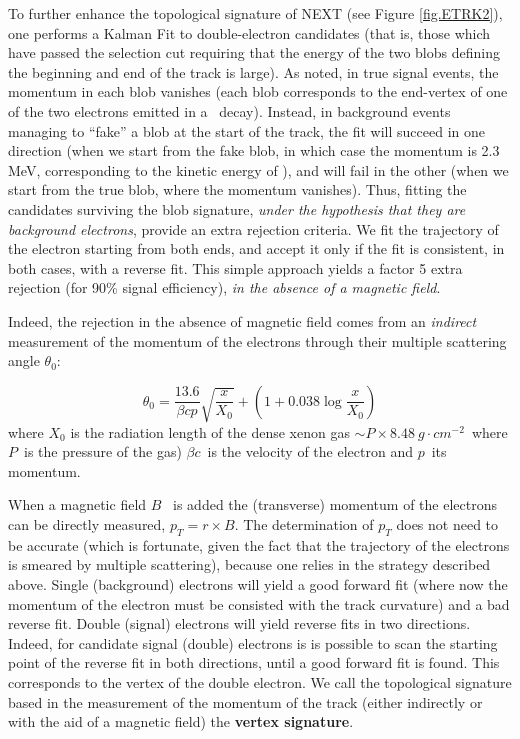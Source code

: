 To further enhance the topological signature of NEXT (see Figure \ref{fig.ETRK2}), one performs a Kalman Fit to double-electron candidates (that is, those which have passed the selection cut requiring that the energy of the two blobs defining the beginning and end of the track is large). As noted, in true signal events, the momentum in each blob vanishes (each blob corresponds to the end-vertex of one of the two electrons emitted in a \bb\ decay). Instead, in background events managing to ``fake'' a blob at the start of the track, the fit will succeed in one direction (when we start from the fake blob, in which case the momentum is 2.3 MeV, corresponding to the kinetic energy of \Qbb), and will fail in the other (when we start from the true blob, where the momentum vanishes). Thus, fitting the candidates surviving the blob signature, {\em under the hypothesis that they are background electrons}, provide an extra rejection criteria. We fit the trajectory of the electron starting from both ends, and accept it only if the fit is consistent, in both cases, with a reverse fit.  This simple approach yields a factor 5 extra rejection (for 90\% signal efficiency), {\em in the absence of a magnetic field}.

Indeed, the rejection in the absence of magnetic field comes from an {\em indirect} measurement of the momentum of the electrons through their multiple scattering
angle $\theta_0$:

\begin{equation}
\theta_{0} = \frac{13.6}{\beta c p}\sqrt{\frac{x}{X_0}}+(1 + 0.038 \log{\frac{x}{X_0}})
\end{equation}
% 
 where $X_0$ is the radiation length of the dense xenon gas 
 $\sim P \times 8.48 ~g\cdot cm^{-2}$~where $P$~is the pressure of the gas) 
 $\beta c$~is the velocity of the electron and $p$~its momentum. 
 
 When a magnetic field $B$~ is added the (transverse) momentum of the electrons can be 
 directly measured,  $p_T = r \times B$. The determination of $p_T$ does not need to be accurate (which is fortunate, given the fact that the trajectory of the electrons is smeared by multiple scattering), because one relies in the strategy described above. Single (background) electrons will yield a good forward fit (where now the momentum of the electron must be consisted with the track curvature) and a bad reverse fit. Double (signal) electrons will yield reverse fits in two directions. Indeed, for candidate signal (double) electrons is is possible to scan the starting point of the reverse fit in both directions, until a good forward fit is found. This corresponds to the vertex of the double electron. We call the topological signature based in the measurement of the momentum of the track (either indirectly or with the aid of a magnetic field) the {\bf vertex signature}.
 

